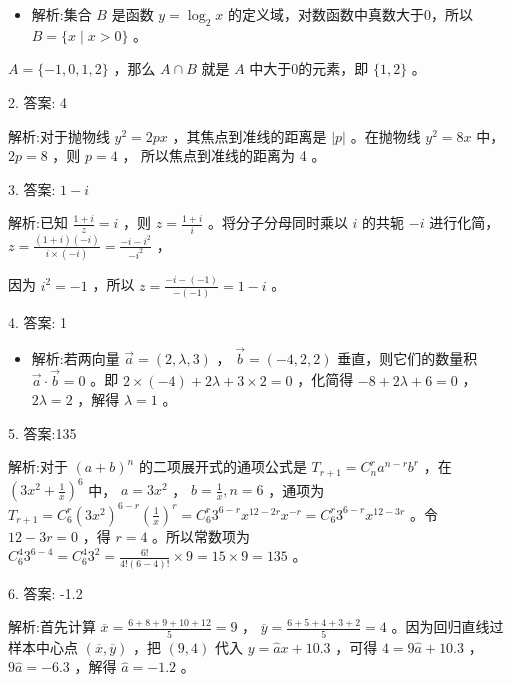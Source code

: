 \documentclass[10pt]{article}
\begin{document}
\begin{itemize}\relax
\item\relax 解析:集合 \(B\) 是函数 \(y = {\log }_{2}x\) 的定义域，对数函数中真数大于0，所以 \(B = \{ x \mid  x > 0\}\) 。
\end{itemize}

\(A = \{  - 1,0,1,2\}\) ，那么 \(A \cap  B\) 就是 \(A\) 中大于0的元素，即 \(\{ 1,2\}\) 。

2. 答案: 4

解析:对于抛物线 \({y}^{2} = {2px}\) ，其焦点到准线的距离是 \(\left| p\right|\) 。在抛物线 \({y}^{2} = {8x}\) 中， \({2p} = 8\) ，则 \(p = 4\) ， 所以焦点到准线的距离为 4 。

3. 答案: \(1 - i\)

解析:已知 \(\frac{1 + i}{z} = i\) ，则 \(z = \frac{1 + i}{i}\) 。将分子分母同时乘以 \(i\) 的共轭 \(- i\) 进行化简， \(z = \frac{\left( {1 + i}\right) \left( {-i}\right) }{i \times  \left( {-i}\right) } = \frac{-i - {i}^{2}}{-{i}^{2}}\) ，

因为 \({i}^{2} =  - 1\) ，所以 \(z = \frac{-i - \left( {-1}\right) }{-\left( {-1}\right) } = 1 - i\) 。

4. 答案: 1

\begin{itemize}\relax
\item\relax 解析:若两向量 \(\overrightarrow{a} = \left( {2,\lambda ,3}\right)\) ， \(\overrightarrow{b} = \left( {-4,2,2}\right)\) 垂直，则它们的数量积 \(\overrightarrow{a} \cdot  \overrightarrow{b} = 0\) 。即 \(2 \times  \left( {-4}\right)  + {2\lambda } + 3 \times  2 = 0\) ，化简得 \(- 8 + {2\lambda } + 6 = 0\) ， \({2\lambda } = 2\) ，解得 \(\lambda  = 1\) 。
\end{itemize}

5. 答案:135

解析:对于 \({\left( a + b\right) }^{n}\) 的二项展开式的通项公式是 \({T}_{r + 1} = {C}_{n}^{r}{a}^{n - r}{b}^{r}\) ，在 \({\left( 3{x}^{2} + \frac{1}{x}\right) }^{6}\) 中， \(a = 3{x}^{2}\) ， \(b = \frac{1}{x},n = 6\) ，通项为 \({T}_{r + 1} = {C}_{6}^{r}{\left( 3{x}^{2}\right) }^{6 - r}{\left( \frac{1}{x}\right) }^{r} = {C}_{6}^{r}{3}^{6 - r}{x}^{{12} - {2r}}{x}^{-r} = {C}_{6}^{r}{3}^{6 - r}{x}^{{12} - {3r}}\) 。令 \({12} - {3r} = 0\) ，得 \(r = 4\) 。所以常数项为 \({C}_{6}^{4}{3}^{6 - 4} = {C}_{6}^{4}{3}^{2} = \frac{6!}{4!\left( {6 - 4}\right) !} \times  9 = {15} \times  9 = {135}\) 。

6. 答案: -1.2

解析:首先计算 \(\overline{x} = \frac{6 + 8 + 9 + {10} + {12}}{5} = 9\) ， \(\overline{y} = \frac{6 + 5 + 4 + 3 + 2}{5} = 4\) 。因为回归直线过样本中心点 \(\left( {\overline{x},\overline{y}}\right)\) ，把 \(\left( {9,4}\right)\) 代入 \(y = \widehat{a}x + {10.3}\) ，可得 \(4 = 9\widehat{a} + {10.3}\) ， \(9\widehat{a} =  - {6.3}\) ，解得 \(\widehat{a} =  - {1.2}\) 。
\end{document}
